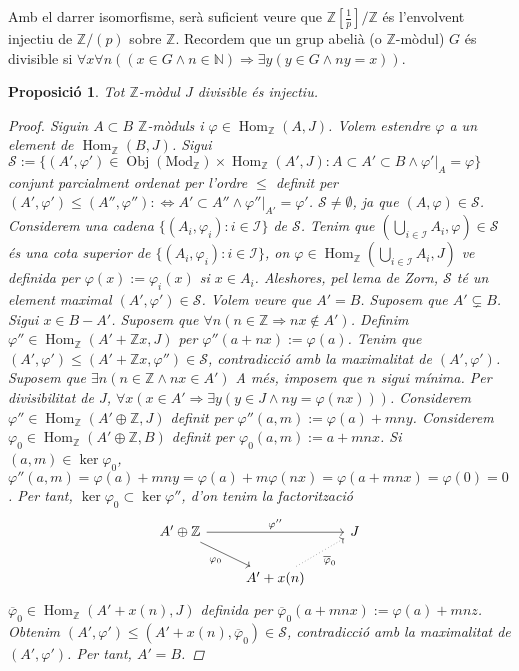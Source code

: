 \documentclass[compress]{article}
\newtheorem{proposicio}{Proposició}
\theoremstyle{definition}
\DeclareMathOperator{\Hom}{Hom}
\DeclareMathOperator{\Obj}{Obj}
\begin{document}
Amb el darrer isomorfisme, serà suficient veure que $\mathbb{Z}[\frac{1}{p}]/\mathbb{Z}$ és l'envolvent injectiu de $\mathbb{Z}/(p)$ sobre $\mathbb{Z}$. Recordem que un grup abelià (o $\mathbb{Z}$-mòdul) $G$ és divisible si $\forall x\forall n((x\in G\land n\in\mathbb{N})\Rightarrow\exists y(y\in G\land ny=x))$.
\begin{proposicio}
    Tot $\mathbb{Z}$-mòdul $J$ divisible és injectiu.
    \begin{proof}
        Siguin $A\subset B$ $\mathbb{Z}$-mòduls i $\varphi\in\Hom_{\mathbb{Z}}(A,J)$. Volem estendre $\varphi$ a un element de $\Hom_{\mathbb{Z}}(B,J)$.\newline
        Sigui $\mathcal{S}:=\{(A',\varphi')\in\Obj(\textrm{Mod}_{\mathbb{Z}})\times\Hom_{\mathbb{Z}}(A',J):A\subset A'\subset B\land\varphi'|_{A}=\varphi\}$ conjunt parcialment ordenat per l'ordre $\leq$ definit per $(A',\varphi')\leq(A'',\varphi''):\iff A'\subset A''\land\varphi''|_{A'}=\varphi'$. $\mathcal{S}\neq\emptyset$, ja que $(A,\varphi)\in\mathcal{S}$. Considerem una cadena $\{(A_{i},\varphi_{i}):i\in\mathscr{I}\}$ de $\mathcal{S}$. Tenim que $(\bigcup_{i\in\mathscr{I}}A_{i},\varphi)\in\mathcal{S}$ és una cota superior de $\{(A_{i},\varphi_{i}):i\in\mathscr{I}\}$, on $\varphi\in\Hom_{\mathbb{Z}}(\bigcup_{i\in\mathscr{I}}A_{i},J)$ ve definida per $\varphi(x):=\varphi_{i}(x)$ si $x\in A_{i}$. Aleshores, pel lema de Zorn, $\mathcal{S}$ té un element maximal $(A',\varphi')\in\mathcal{S}$.\newline
        Volem veure que $A'=B$. Suposem que $A'\subsetneq B$. Sigui $x\in B-A'$. Suposem que $\forall n(n\in\mathbb{Z}\Rightarrow nx\notin A')$. Definim $\varphi''\in\Hom_{\mathbb{Z}}(A'+\mathbb{Z}x,J)$ per $\varphi''(a+nx):=\varphi(a)$. Tenim que $(A',\varphi')\leq(A'+\mathbb{Z}x,\varphi'')\in\mathcal{S}$, contradicció amb la maximalitat de $(A',\varphi')$. Suposem que $\exists n(n\in\mathbb{Z}\land nx\in A')$ A més, imposem que $n$ sigui mínima. Per divisibilitat de $J$, $\forall x(x\in A'\Rightarrow\exists y(y\in J\land ny=\varphi(nx)))$. Considerem $\varphi''\in\Hom_{\mathbb{Z}}(A'\oplus\mathbb{Z},J)$ definit per $\varphi''(a,m):=\varphi(a)+mny$. Considerem $\varphi_{0}\in\Hom_{\mathbb{Z}}(A'\oplus\mathbb{Z},B)$ definit per $\varphi_{0}(a,m):=a+mnx$. Si $(a,m)\in\ker{\varphi_{0}}$, $\varphi''(a,m)=\varphi(a)+mny=\varphi(a)+m\varphi(nx)=\varphi(a+mnx)=\varphi(0)=0$. Per tant, $\ker{\varphi_{0}}\subset\ker{\varphi''}$, d'on tenim la factorització
        \begin{equation*}
        \begin{tikzcd}
            A'\oplus\mathbb{Z}
            \arrow{rr}{\varphi''}
            \arrow[swap]{rd}{\varphi_{0}}
            &&J\\
            &A'+x(n)
            \arrow[dotted, swap]{ru}{\overline{\varphi}_{0}}
        \end{tikzcd}
        \end{equation*}
        $\overline{\varphi}_{0}\in\Hom_{\mathbb{Z}}(A'+x(n),J)$ definida per $\overline{\varphi}_{0}(a+mnx):=\varphi(a)+mnz$. Obtenim $(A',\varphi')\leq(A'+x(n),\overline{\varphi}_{0})\in\mathcal{S}$, contradicció amb la maximalitat de $(A',\varphi')$. Per tant, $A'=B$.
    \end{proof}
\end{proposicio}
\end{document}
